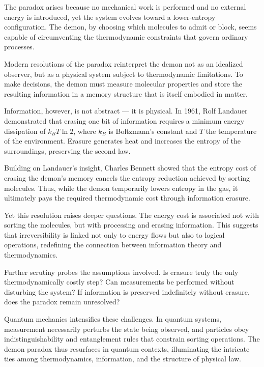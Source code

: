The paradox arises because no mechanical work is performed and no external energy is introduced, yet the system evolves toward a lower-entropy configuration. The demon, by choosing which molecules to admit or block, seems capable of circumventing the thermodynamic constraints that govern ordinary processes.

Modern resolutions of the paradox reinterpret the demon not as an idealized observer, but as a physical system subject to thermodynamic limitations. To make decisions, the demon must measure molecular properties and store the resulting information in a memory structure that is itself embodied in matter.

Information, however, is not abstract — it is physical. In 1961, Rolf Landauer demonstrated that erasing one bit of information requires a minimum energy dissipation of $k_B T \ln 2$, where $k_B$ is Boltzmann’s constant and $T$ the temperature of the environment. Erasure generates heat and increases the entropy of the surroundings, preserving the second law.

Building on Landauer’s insight, Charles Bennett showed that the entropy cost of erasing the demon’s memory cancels the entropy reduction achieved by sorting molecules. Thus, while the demon temporarily lowers entropy in the gas, it ultimately pays the required thermodynamic cost through information erasure.

Yet this resolution raises deeper questions. The energy cost is associated not with sorting the molecules, but with processing and erasing information. This suggests that irreversibility is linked not only to energy flows but also to logical operations, redefining the connection between information theory and thermodynamics.

Further scrutiny probes the assumptions involved. Is erasure truly the only thermodynamically costly step? Can measurements be performed without disturbing the system? If information is preserved indefinitely without erasure, does the paradox remain unresolved?

Quantum mechanics intensifies these challenges. In quantum systems, measurement necessarily perturbs the state being observed, and particles obey indistinguishability and entanglement rules that constrain sorting operations. The demon paradox thus resurfaces in quantum contexts, illuminating the intricate ties among thermodynamics, information, and the structure of physical law.


